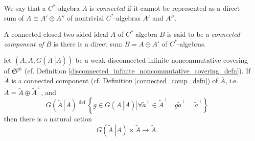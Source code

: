 \documentclass{beamer}
\theoremstyle{plain}
\newcommand{\be}{\begin{equation}}
\newcommand{\ee}{\end{equation}}
\newcommand{\bydef}{\stackrel{\mathrm{def}}{=}}
\begin{document}
\begin{frame}
\begin{definition}\label{connected_c_a_defn}
	We say that a $C^*$-algebra $A$ is \textit{connected} if it cannot be represented as a direct sum of $A \cong A' \oplus A''$ of nontrivial $C^*$-algebras $A'$ and $A''$.
	
\end{definition}
\begin{definition}\label{connected_comp_defn}
	A connected closed two-sided ideal $A$ of  $C^*$-algebra $B$ is said to be a \textit{connected component of}  $B$ is there is a direct sum $B = A \oplus A'$ of $C^*$-algebras.
\end{definition}
let $\left(A, \overline{A}, G\left(\left.\overline{A}~\right| A\right)\right)$ be a weak disconnected infinite noncommutative covering of $\mathfrak{S}^{\mathrm{pt}}$ (cf. Definition \ref{disconnected_infinite_noncommutative_covering_defn}). If $\widetilde A$ is a connected component (cf. Definition \ref{connected_comp_defn}) of $\overline{A}$, i.e. $\overline{A} = \widetilde A \oplus \widetilde A^\perp$, and
\be\label{infinite_covering_transformation_group_eqn}
G\left(\left.\widetilde{A}~\right| A\right)\bydef 
\left\{\left. g \in  G\left(\left.\overline{A}~\right| A\right)\right| \forall \widetilde a^\perp \in \widetilde A^\perp \quad g \widetilde a^\perp= \widetilde a^\perp\right\}
\ee
then there is a natural action
\be\label{gta_act_eqn}
G\left(\left.\widetilde{A}~\right| A\right)\times \widetilde{A} \to \widetilde{A}.
\ee
\end{frame}
\end{document}
